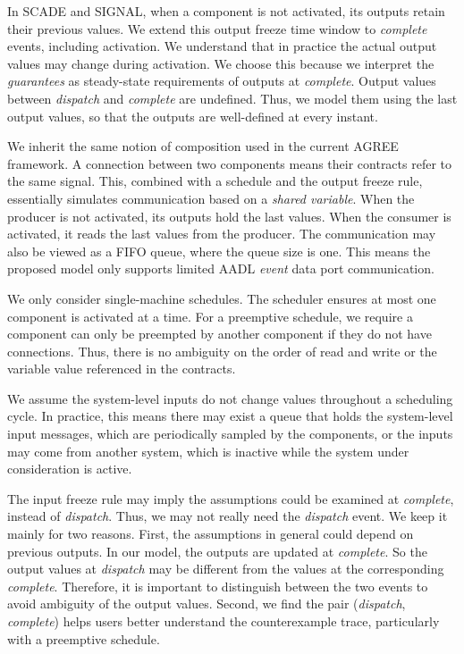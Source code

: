 In SCADE and SIGNAL, when a component is not activated, its outputs retain their previous values. We extend this output freeze time window to \emph{complete} events, including activation. We understand that in practice the actual output values may change during activation. We choose this because we interpret the \emph{guarantees} as steady-state requirements of outputs at \emph{complete}. Output values between \textit{dispatch} and \textit{complete} are undefined. Thus, we model them using the last output values, so that the outputs are well-defined at every instant.

We inherit the same notion of composition used in the current AGREE framework. A connection between two components means their contracts refer to the same signal. 
This, combined with a schedule and the output freeze rule, essentially simulates communication based on a \emph{shared variable}. When the producer is not activated, its outputs hold the last values. When the consumer is activated, it reads the last values from the producer. The communication may also be viewed as a FIFO queue, where the queue size is one. %
This means the proposed model only supports limited AADL \textit{event} data port communication.

We only consider single-machine schedules. The scheduler ensures at most one component is activated at a time. For a preemptive schedule, we require a component can only be preempted by another component if they do not have connections. Thus, there is no ambiguity on the order of read and write or the variable value referenced in the contracts.

We assume the system-level inputs do not change values throughout a scheduling cycle. In practice, this means there may exist a queue that holds the system-level input messages, which are periodically sampled by the components, or the inputs may come from another system, which is inactive while the system under consideration is active.

The input freeze rule may imply the assumptions could be examined at \emph{complete}, instead of \emph{dispatch}. Thus, we may not really need the \emph{dispatch} event. We keep it mainly for two reasons. First, the assumptions in general could depend on previous outputs. In our model, the outputs are updated at \emph{complete}. So the output values at \emph{dispatch} may be different from the values at the corresponding \emph{complete}. Therefore, it is important to distinguish between the two events to avoid ambiguity of the output values. Second, we find the pair (\emph{dispatch}, \emph{complete}) helps users better understand the counterexample trace, particularly with a preemptive schedule.

